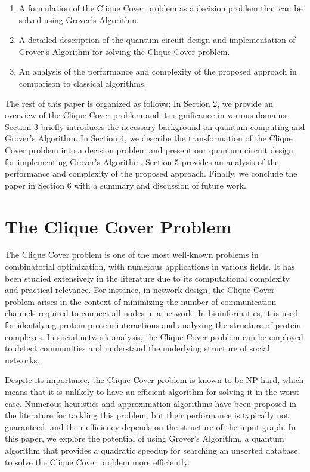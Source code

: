 \begin{enumerate}
    \item A formulation of the Clique Cover problem as a decision problem that can be solved using Grover's Algorithm.
    \item A detailed description of the quantum circuit design and implementation of Grover's Algorithm for solving the Clique Cover problem.
    \item An analysis of the performance and complexity of the proposed approach in comparison to classical algorithms.
\end{enumerate}

The rest of this paper is organized as follows: In Section 2, we provide an overview of the Clique Cover problem and its significance in various domains. Section 3 briefly introduces the necessary background on quantum computing and Grover's Algorithm. In Section 4, we describe the transformation of the Clique Cover problem into a decision problem and present our quantum circuit design for implementing Grover's Algorithm. Section 5 provides an analysis of the performance and complexity of the proposed approach. Finally, we conclude the paper in Section 6 with a summary and discussion of future work.

\section{The Clique Cover Problem}

The Clique Cover problem is one of the most well-known problems in combinatorial optimization, with numerous applications in various fields. It has been studied extensively in the literature due to its computational complexity and practical relevance. For instance, in network design, the Clique Cover problem arises in the context of minimizing the number of communication channels required to connect all nodes in a network. In bioinformatics, it is used for identifying protein-protein interactions and analyzing the structure of protein complexes. In social network analysis, the Clique Cover problem can be employed to detect communities and understand the underlying structure of social networks.

Despite its importance, the Clique Cover problem is known to be NP-hard, which means that it is unlikely to have an efficient algorithm for solving it in the worst case. Numerous heuristics and approximation algorithms have been proposed in the literature for tackling this problem, but their performance is typically not guaranteed, and their efficiency depends on the structure of the input graph. In this paper, we explore the potential of using Grover's Algorithm, a quantum algorithm that provides a quadratic speedup for searching an unsorted database, to solve the Clique Cover problem more efficiently.

